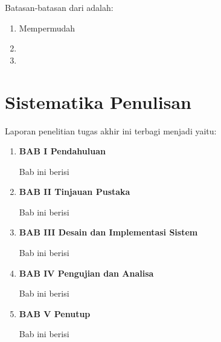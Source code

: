 Batasan-batasan dari \lipsum[1][1-3] adalah:

\begin{enumerate}[nolistsep]

  \item Mempermudah \lipsum[2][1-3]

  \item \lipsum[3][1-5]

  \item \lipsum[4][1-5]

\end{enumerate}

\section{Sistematika Penulisan}
\label{sec:sistematikapenulisan}

Laporan penelitian tugas akhir ini terbagi menjadi \lipsum[1][1-3] yaitu:

\begin{enumerate}[nolistsep]

  \item \textbf{BAB I Pendahuluan}

  Bab ini berisi \lipsum[2][1-5]

  \vspace{2ex}

  \item \textbf{BAB II Tinjauan Pustaka}

  Bab ini berisi \lipsum[3][1-5]

  \vspace{2ex}

  \item \textbf{BAB III Desain dan Implementasi Sistem}

  Bab ini berisi \lipsum[4][1-5]

  \vspace{2ex}

  \item \textbf{BAB IV Pengujian dan Analisa}

  Bab ini berisi \lipsum[5][1-5]

  \vspace{2ex}

  \item \textbf{BAB V Penutup}

  Bab ini berisi \lipsum[6][1-5]

\end{enumerate}
